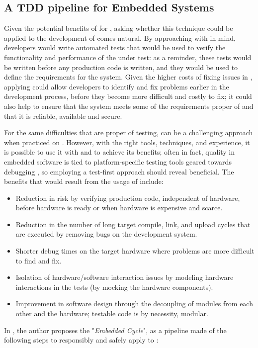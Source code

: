 \subsection{A TDD pipeline for Embedded Systems}
Given the potential benefits of \tdd for \noess, asking whether this technique could be applied to the development of \ess comes natural. By approaching \es with \tdd in mind, developers would write automated tests that would be used to verify the functionality and performance of the \es under test: as a reminder, these tests would be written before any production code is written, and they would be used to define the requirements for the system. 
Given the higher costs of fixing issues in \ess, applying \tdd could allow developers to identify and fix problems earlier in the development process, before they become more difficult and costly to fix; it could also help to ensure that the system meets some of the requirements proper of \ess and that it is reliable, available and secure.

For the same difficulties that are proper of \es testing, \tdd can be a challenging approach when practiced on \ess. However, with the right tools, techniques, and experience, it is possible to use it with and to achieve its benefits; often in fact, quality in embedded software is tied to platform-specific testing tools geared towards debugging \cite{TDDEmbeddedSoftware}, so employing a test-first approach should reveal beneficial.
The benefits that would result from the usage of \tdd include:
\begin{itemize}
    \item Reduction in risk by verifying production code, independent of hardware, before hardware is ready or when hardware is expensive and scarce.
    \item Reduction in the number of long target compile, link, and upload cycles that are executed by removing bugs on the development system.
    \item Shorter debug times on the target hardware where problems are more difficult to find and fix.
    \item Isolation of hardware/software interaction issues by modeling hardware interactions in the tests (\eg by mocking the hardware components).
    \item Improvement in software design through the decoupling of modules from each other and the hardware; testable code is by necessity, modular.
\end{itemize}


\noindent In \cite{TDDEC}, the author proposes the "\textit{Embedded \tdd Cycle}", as a pipeline made of the following steps to responsibly and safely apply \tdd to \ess:

